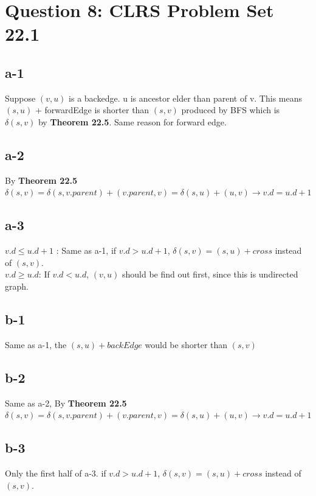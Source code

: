 \documentclass[]{article}
\begin{document}
\section{Question 8: CLRS Problem Set 22.1}

\subsection{a-1}

Suppose $(v,u)$ is a backedge. u is ancestor elder than parent of v. This means $(s,u)$ + forwardEdge is shorter than $(s,v)$ produced by BFS which is $\delta(s,v)$ by \textbf{Theorem 22.5}. Same reason for forward edge.   

\subsection{a-2}

By \textbf{Theorem 22.5} $\delta(s,v) = \delta(s,v.parent) + (v.parent, v) = \delta(s,u) + (u,v) \rightarrow v.d = u.d + 1$

\subsection{a-3}

$v.d \le u.d + 1$ : Same as a-1, if $v.d > u.d + 1$, $\delta(s,v) = (s,u) + cross$ instead of $(s,v)$. \\
$v.d \ge u.d$: If $v.d < u.d$, $(v,u)$ should be find out first, since this is undirected graph. 

\subsection{b-1}

Same as a-1, the $(s, u) + backEdge$ would be shorter than $(s, v)$

\subsection{b-2}

Same as a-2, By \textbf{Theorem 22.5} $\delta(s,v) = \delta(s,v.parent) + (v.parent, v) = \delta(s,u) + (u,v) \rightarrow v.d = u.d + 1$

\subsection{b-3}

Only the first half of a-3. if $v.d > u.d + 1$, $\delta(s,v) = (s,u) + cross$ instead of $(s,v)$. 
\end{document}
